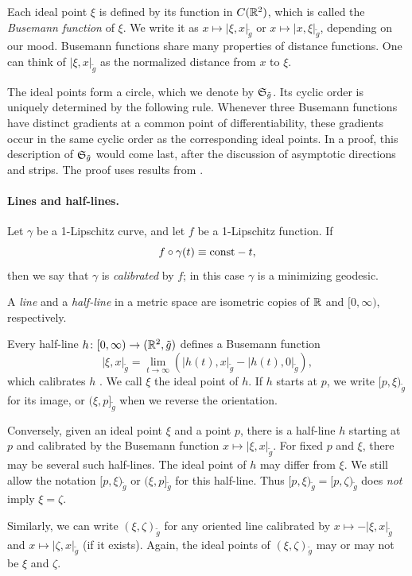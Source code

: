 \documentclass[a4paper,10pt]{article}
\begin{document}
Each ideal point $\xi$ is defined by its function in $C(\RR^2)$, which is called the \emph{Busemann function} of $\xi$.
We write it as $x\mapsto |\xi,x|_{\tilde g}$ or $x\mapsto |x,\xi|_{\tilde g}$, depending on our mood.
Busemann functions share many properties of distance functions.
One can think of $|\xi,x|_{\tilde g}$ as the normalized distance from $x$ to $\xi$.

The ideal points form a circle, which we denote by $\S_{\tilde g}$.
Its cyclic order is uniquely determined by the following rule.
Whenever three Busemann functions have distinct gradients at a common point of differentiability, these gradients occur in the same cyclic order as the corresponding ideal points.
In a proof, this description of $\S_{\tilde g}$ would come last,
after the discussion of asymptotic directions and strips.
The proof uses results from \cite[4.15, 6.1, and 8.7(i)]{schroeder-survey}.


\paragraph{Lines and half-lines.}
Let $\gamma$ be a 1-Lipschitz curve, and let $f$ be a 1-Lipschitz function.
If
\[f\circ\gamma(t)\equiv\const-t,\]
then we say that $\gamma$ is \emph{calibrated} by $f$;
in this case $\gamma$ is a minimizing geodesic.

A \emph{line} and a \emph{half-line} in a metric space are isometric copies of $\RR$ and $[0,\infty)$, respectively.

Every half-line $h\colon[0,\infty)\to (\RR^2,\tilde g)$ defines a Busemann function
\[|\xi,x|_{\tilde g}=\lim_{t\to\infty}(|h(t),x|_{\tilde g}-|h(t),0|_{\tilde g}),\]
which calibrates $h$ \cite[§~22]{busemann}.
We call $\xi$ the ideal point of $h$.
If $h$ starts at $p$, we write $[p,\xi)_{\tilde g}$ for its image, or $(\xi,p]_{\tilde g}$ when we reverse the orientation.

Conversely, given an ideal point $\xi$ and a point $p$, there is a half-line $h$ starting at $p$ and calibrated by the Busemann function $x\mapsto|\xi,x|_{\tilde g}$.
For fixed $p$ and $\xi$, there may be several such half-lines.
The ideal point of $h$ may differ from $\xi$.
We still allow the notation $[p,\xi)_{\tilde g}$ or $(\xi,p]_{\tilde g}$ for this half-line.
Thus $[p,\xi)_{\tilde g}=[p,\zeta)_{\tilde g}$ does \textit{not} imply $\xi=\zeta$.

Similarly, we can write $(\xi,\zeta)_{\tilde g}$ for any oriented line calibrated by $x\mapsto-|\xi,x|_{\tilde g}$ and $x\mapsto|\zeta,x|_{\tilde g}$ (if it exists).
Again, the ideal points of $(\xi,\zeta)_{\tilde g}$ may or may not be $\xi$ and $\zeta$.
\end{document}
